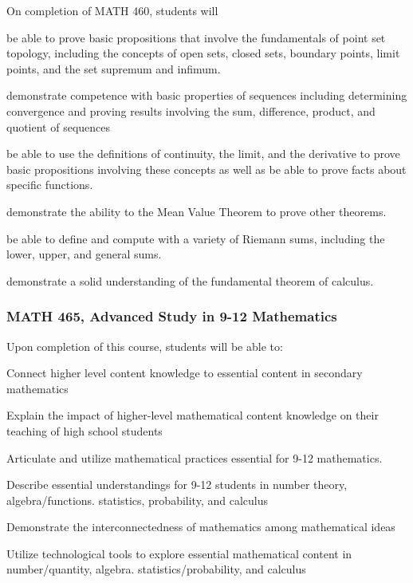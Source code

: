 On completion of MATH 460, students will
\begin{alphalist}
    \item be able to prove basic propositions that involve the fundamentals of point set topology, including the concepts of open sets, closed sets, boundary points, limit points, and the set supremum and infimum. 
    \item demonstrate competence with basic properties of sequences including determining convergence and proving results involving the sum, difference, product, and quotient of sequences
    \item be able to use the definitions of continuity, the limit, and the derivative to prove basic propositions involving these concepts as well as be able to prove facts about specific functions.
    \item demonstrate the ability to the Mean Value Theorem to prove other theorems. 
    \item be able to define and compute with a variety of Riemann sums, including the lower, upper, and general sums.
    \item demonstrate a solid understanding of the fundamental theorem of calculus.
\end{alphalist}

\subsubsection*{MATH 465, Advanced Study in 9-12 Mathematics}

Upon completion of this course, students will be able to:
\begin{alphalist}

\item Connect higher level content knowledge to essential content in secondary mathematics
\item Explain the impact of higher-level mathematical content knowledge on their teaching of high school students
\item Articulate and utilize mathematical practices essential for 9-12 mathematics.
\item Describe essential understandings for 9-12 students in number theory, algebra/functions. statistics, probability, and calculus
\item Demonstrate the interconnectedness of mathematics among mathematical ideas
\item Utilize technological tools to explore essential mathematical content in number/quantity, algebra. statistics/probability, and calculus
\end{alphalist}

